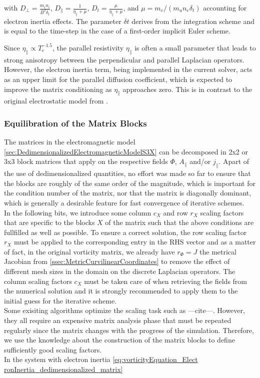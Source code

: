 with $D_\perp = \frac{m_i n_i}{B^2 \delta_t}$, $D_\parallel = \frac{1}{\eta_\parallel + \mu}$, $D_t = \frac{\mu}{\eta_\parallel + \mu}$, and $\mu = m_e / (m_u n_e \delta_t)$ accounting for electron inertia effects. The parameter $\delta t$ derives from the integration scheme and is equal to the time-step in the case of a first-order implicit Euler scheme. \newline

Since $\eta_\parallel \propto T_e^{-1.5}$, the parallel resistivity $\eta_\parallel$ is often a small parameter that leads to strong anisotropy between the perpendicular and parallel Laplacian operators. However, the electron inertia term, being implemented in the current solver, acts as an upper limit for the parallel diffusion coefficient, which is expected to improve the matrix conditioning as $\eta_\parallel$ approaches zero. This is in contrast to the original electrostatic model from \cite{Bufferand2021}. \newline


\subsubsection{Equilibration of the Matrix Blocks}
\label{ssec:equilibrationBLockMatrices}
The matrices in the electromagnetic model \autoref{sec:DedimensionalizedElectromagneticModelS3X} can be decomposed in 2x2 or 3x3 block matrices that apply on the respective fields $\Phi$, $A_\parallel$ and/or $j_\parallel$. Apart of the use of dedimensionalized quantities, no effort was made so far to ensure that the blocks are roughly of the same order of the magnitude, which is important for the condition number of the matrix, nor that the matrix is diagonally dominant, which is generally a desirable feature for fast convergence of iterative schemes. \\
In the following bits, we introduce some column $c_X$ and row $r_X$ scaling factors that are specific to the blocks $X$ of the matrix such that the above conditions are fullfilled as well as possible. To ensure a correct solution, the row scaling factor $r_X$ must be applied to the corresponding entry in the RHS vector and as a matter of fact, in the original vorticity matrix, we already have $r_\Phi = J$ the metrical Jacobian from \autoref{ssec:MetricCurvilinearCoordinates} to remove the effect of different mesh sizes in the domain on the discrete Laplacian operators. The column scaling factors $c_X$ must be taken care of when retrieving the fields from the numerical solution and it is strongly recommended to apply them to the initial guess for the iterative scheme. \\ 
Some exisiting algorithms optimize the scaling task such as ---cite---. However, they all require an expensive matrix analysis phase that must be repeated regularly since the matrix changes with the progress of the simulation. Therefore, we use the knowledge about the construction of the matrix blocks to define sufficiently good scaling factors. \\
In the system with electron inertia \autoref{eq:vorticityEquation_Elect	ronInertia_dedimensionalized_matrix}


